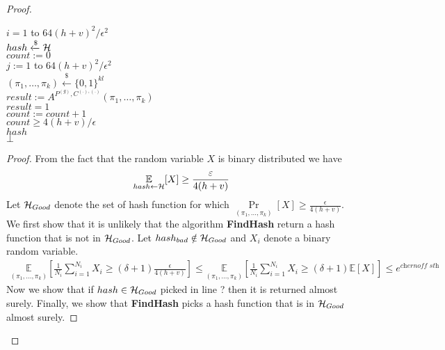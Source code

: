 \begin{proof}
\begin{codeblock}
  \For $i = 1$ to $64(h+v)^2/\epsilon^2$ \\
  \IndI $hash \xleftarrow{\$} \mathcal{H}$ \\
  \IndI $count := 0$ \\
  \IndI \For $j := 1$ to $64(h+v)^2/\epsilon^2$ \\
  \IndII $(\pi_1, \dots, \pi_k) \xleftarrow{\$} \{0,1\}^{kl} $\\
  \IndII $result := A^{P^{(g)},C^{(.), (.)}}(\pi_1, \dots, \pi_k)$\\
  \IndII \If $result = 1$\\
  \IndIII $count := count + 1$\\
  \IndI \If $count \geq 4(h+v)/\epsilon$ \\
  \IndII \return $hash$\\
  \return $\bot$
\end{codeblock}
\begin{proof}
From the fact that the random variable $X$ is binary distributed we have
\begin{align*}
  \underset{hash \leftarrow \mathcal{H}}{\mathbb{E}}[X] \geq \frac{\varepsilon}{4(h+v)}
\end{align*}
Let $\mathcal{H}_{Good}$ denote the set of hash function for which $\underset{(\pi_1, \dots, \pi_k)}{\Pr}[X] \geq \frac{\epsilon}{4(h+v)}$.
We first show that it is unlikely that the algorithm \textbf{FindHash} return a hash function that is not in $\mathcal{H}_{Good}$.
Let $hash_{bad} \notin \mathcal{H}_{Good}$ and $X_i$ denote a binary random variable.
\begin{align*}
  \underset{(\pi_1, \dots, \pi_k)}{\mathbb{E}} \left[\frac{1}{N_i} \sum_{i=1}^{N_i} X_i \geq (\delta + 1) \frac{\epsilon}{4(h+v)} \right]\leq
  \underset{(\pi_1, \dots, \pi_k)}{\mathbb{E}}\left[\frac{1}{N_i} \sum_{i=1}^{N_i} X_i \geq (\delta + 1) \mathbb{E}[X]\right] \leq
  e^{\textit{chernoff sth}}
\end{align*}
%
Now we show that if $hash \in \mathcal{H}_{Good}$ picked in line ? then it is returned almost surely.
%
Finally, we show that \textbf{FindHash} picks a hash function that is in $\mathcal{H}_{Good}$ almost surely.
%
\end{proof}

\end{proof}
%
%
